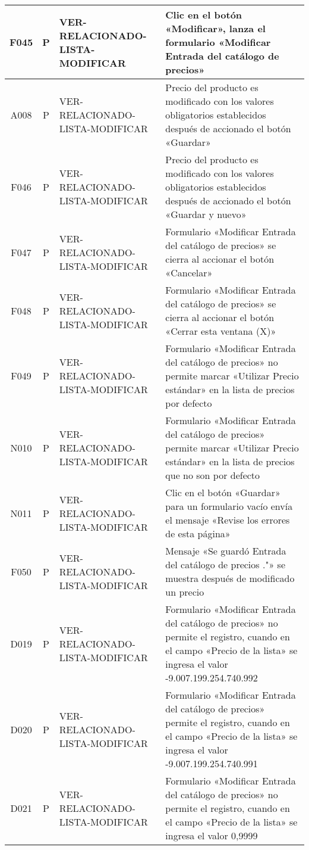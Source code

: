 \begin{landscape}
{\begin{longtable}[htb]{|c|c|p{5.0cm}|p{14.0cm}|}
F045 & P & VER-RELACIONADO-LISTA-MODIFICAR & Clic en el botón «Modificar», lanza el formulario «Modificar Entrada del catálogo de precios» \\ \hline
A008 & P & VER-RELACIONADO-LISTA-MODIFICAR & Precio del producto es modificado con los valores obligatorios establecidos después de accionado el botón «Guardar» \\ \hline
F046 & P & VER-RELACIONADO-LISTA-MODIFICAR & Precio del producto es modificado con los valores obligatorios establecidos después de accionado el botón «Guardar y nuevo» \\ \hline
F047 & P & VER-RELACIONADO-LISTA-MODIFICAR & Formulario «Modificar Entrada del catálogo de precios» se cierra al accionar el botón «Cancelar» \\ \hline
F048 & P & VER-RELACIONADO-LISTA-MODIFICAR & Formulario «Modificar Entrada del catálogo de precios» se cierra al accionar el botón «Cerrar esta ventana (X)» \\ \hline
F049 & P & VER-RELACIONADO-LISTA-MODIFICAR & Formulario «Modificar Entrada del catálogo de precios» no permite marcar «Utilizar Precio estándar» en la lista de precios por defecto \\ \hline
N010 & P & VER-RELACIONADO-LISTA-MODIFICAR & Formulario «Modificar Entrada del catálogo de precios» permite marcar «Utilizar Precio estándar» en la lista de precios que no son por defecto \\ \hline
N011 & P & VER-RELACIONADO-LISTA-MODIFICAR & Clic en el botón «Guardar» para un formulario vacío envía el mensaje «Revise los errores de esta página» \\ \hline
F050 & P & VER-RELACIONADO-LISTA-MODIFICAR & Mensaje «Se guardó Entrada del catálogo de precios ."» se muestra después de modificado un precio \\ \hline
D019 & P & VER-RELACIONADO-LISTA-MODIFICAR & Formulario «Modificar Entrada del catálogo de precios» no permite el registro, cuando en el campo «Precio de la lista» se ingresa el valor -9.007.199.254.740.992 \\ \hline
D020 & P & VER-RELACIONADO-LISTA-MODIFICAR & Formulario «Modificar Entrada del catálogo de precios» permite el registro, cuando en el campo «Precio de la lista» se ingresa el valor -9.007.199.254.740.991 \\ \hline
D021 & P & VER-RELACIONADO-LISTA-MODIFICAR & Formulario «Modificar Entrada del catálogo de precios» no permite el registro, cuando en el campo «Precio de la lista» se ingresa el valor 0,9999 \\ \hline

\end{longtable}}
\end{landscape}
